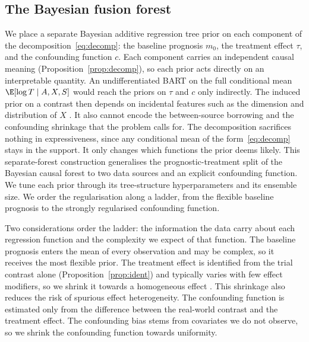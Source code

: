 \subsection{The Bayesian fusion forest}

We place a separate Bayesian additive regression tree prior on each component of the decomposition~\eqref{eq:decomp}: the baseline prognosis $m_0$, the treatment effect $\tau$, and the confounding function $c$.
Each component carries an independent causal meaning (Proposition~\ref{prop:decomp}), so each prior acts directly on an interpretable quantity.
An undifferentiated BART on the full conditional mean $\E[\log T \mid A, X, S]$ would reach the priors on $\tau$ and $c$ only indirectly.
The induced prior on a contrast then depends on incidental features such as the dimension and distribution of $X$ \citep{hahn2020bayesian}.
It also cannot encode the between-source borrowing and the confounding shrinkage that the problem calls for.
The decomposition sacrifices nothing in expressiveness, since any conditional mean of the form~\eqref{eq:decomp} stays in the support.
It only changes which functions the prior deems likely.
This separate-forest construction generalises the prognostic-treatment split of the Bayesian causal forest \citep{hahn2020bayesian} to two data sources and an explicit confounding function.
We tune each prior through its tree-structure hyperparameters and its ensemble size.
We order the regularisation along a ladder, from the flexible baseline prognosis to the strongly regularised confounding function.

Two considerations order the ladder: the information the data carry about each regression function and the complexity we expect of that function.
The baseline prognosis enters the mean of every observation and may be complex, so it receives the most flexible prior.
The treatment effect is identified from the trial contrast alone (Proposition~\ref{prop:ident}) and typically varies with few effect modifiers, so we shrink it towards a homogeneous effect \citep{hahn2020bayesian}.
This shrinkage also reduces the risk of spurious effect heterogeneity.
The confounding function is estimated only from the difference between the real-world contrast and the treatment effect.
The confounding bias stems from covariates we do not observe, so we shrink the confounding function towards uniformity.

